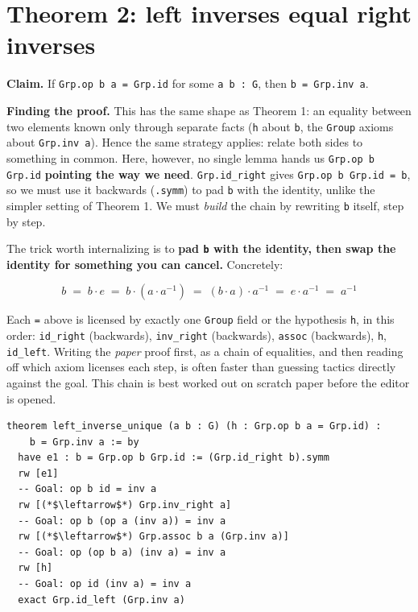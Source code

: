 \section{Theorem 2: left inverses equal right inverses}\label{sec:07-group-theorems:03-theorem-2:1}

\textbf{Claim.} If \texttt{Grp.op b a = Grp.id} for some \texttt{a b : G}, then \texttt{b = Grp.inv a}.

\textbf{Finding the proof.} This has the same shape as Theorem 1: an equality between two elements known only through separate facts (\texttt{h} about \texttt{b}, the \texttt{Group} axioms about \texttt{Grp.inv a}). Hence the same strategy applies: relate both sides to something in common. Here, however, no single lemma hands us \texttt{Grp.op b Grp.id} \textbf{pointing the way we need}. \texttt{Grp.id\_\allowbreak{}right} gives \texttt{Grp.op b Grp.id = b}, so we must use it backwards (\texttt{.symm}) to pad \texttt{b} with the identity, unlike the simpler setting of Theorem 1. We must \emph{build} the chain by rewriting \texttt{b} itself, step by step.

The trick worth internalizing is to \textbf{pad \texttt{b} with the identity, then swap the identity for something you can cancel.} Concretely:

\[
b \;=\; b \cdot e \;=\; b \cdot (a \cdot a^{-1}) \;=\; (b \cdot a) \cdot a^{-1} \;=\; e \cdot a^{-1} \;=\; a^{-1}
\]

Each \texttt{=} above is licensed by exactly one \texttt{Group} field or the hypothesis \texttt{h}, in this order: \texttt{id\_\allowbreak{}right} (backwards), \texttt{inv\_\allowbreak{}right} (backwards), \texttt{assoc} (backwards), \texttt{h}, \texttt{id\_\allowbreak{}left}. Writing the \emph{paper} proof first, as a chain of equalities, and then reading off which axiom licenses each step, is often faster than guessing tactics directly against the goal. This chain is best worked out on scratch paper before the editor is opened.

\begin{lstlisting}
theorem left_inverse_unique (a b : G) (h : Grp.op b a = Grp.id) :
    b = Grp.inv a := by
  have e1 : b = Grp.op b Grp.id := (Grp.id_right b).symm
  rw [e1]
  -- Goal: op b id = inv a
  rw [(*$\leftarrow$*) Grp.inv_right a]
  -- Goal: op b (op a (inv a)) = inv a
  rw [(*$\leftarrow$*) Grp.assoc b a (Grp.inv a)]
  -- Goal: op (op b a) (inv a) = inv a
  rw [h]
  -- Goal: op id (inv a) = inv a
  exact Grp.id_left (Grp.inv a)
\end{lstlisting}

